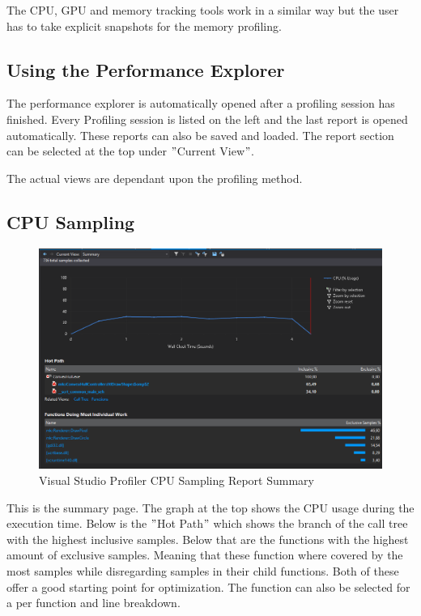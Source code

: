 The CPU, GPU and memory tracking tools work in a similar way but the user has to take explicit snapshots for the memory profiling.

\subsection{Using the Performance Explorer}

The performance explorer is automatically opened after a profiling session has finished.
Every Profiling session is listed on the left and the last report is opened automatically.
These reports can also be saved and loaded. The report section can be selected at the top under $"$Current View$"$.

The actual views are dependant upon the profiling method.

\subsection{CPU Sampling}

\begin{figure}[htbp]
\includegraphics[scale = 0.28]{img/VisSummary.PNG}
\caption{Visual Studio Profiler CPU Sampling Report Summary}
\label{fig:VisualStudioProfilerSamplingSummary}
\end{figure}

This is the summary page. The graph at the top shows the CPU usage during the execution time.
Below is the $"$Hot Path$"$ which shows the branch of the call tree with the highest inclusive samples.
Below that are the functions with the highest amount of exclusive samples. Meaning that these function where covered by the most samples while disregarding samples in their child functions. Both of these offer a good starting point for optimization. The function can also be selected for a per function and line breakdown.

